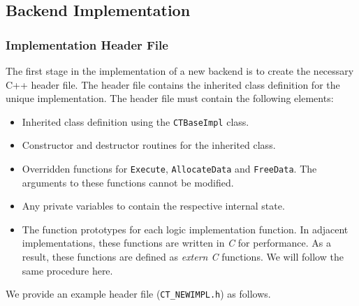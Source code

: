 \documentclass{article}
\begin{document}
\clearpage
\subsection{Backend Implementation}
\label{sec:BackendImpl}

\subsubsection{Implementation Header File}

The first stage in the implementation of a new backend is to create the necessary C++ 
header file.  The header file contains the inherited class definition for the unique implementation.  
The header file must contain the following elements: 

\begin{itemize}
\item Inherited class definition using the \texttt{CTBaseImpl} class.
\item Constructor and destructor routines for the inherited class.
\item Overridden functions for \texttt{Execute}, \texttt{AllocateData} and \texttt{FreeData}.  The arguments to these functions cannot be modified.
\item Any private variables to contain the respective internal state.
\item The function prototypes for each logic implementation function.  In adjacent implementations, these functions are written in
\textit{C} for performance.  As a result, these functions are defined as \textit{extern C} functions.  We will follow the same procedure here.
\end{itemize}

We provide an example header file (\texttt{CT\_NEWIMPL.h}) as follows.  
\end{document}
